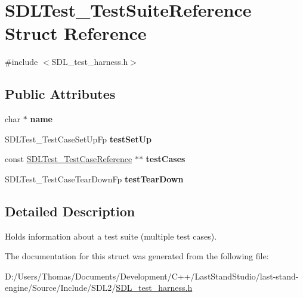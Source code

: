 \hypertarget{structSDLTest__TestSuiteReference}{}\section{S\+D\+L\+Test\+\_\+\+Test\+Suite\+Reference Struct Reference}
\label{structSDLTest__TestSuiteReference}


{\ttfamily \#include $<$S\+D\+L\+\_\+test\+\_\+harness.\+h$>$}

\subsection*{Public Attributes}
\begin{DoxyCompactItemize}
\item 
\hypertarget{structSDLTest__TestSuiteReference_a8b002d932f91b321b384e59ae17f8f39}{}char $\ast$ {\bfseries name}\label{structSDLTest__TestSuiteReference_a8b002d932f91b321b384e59ae17f8f39}

\item 
\hypertarget{structSDLTest__TestSuiteReference_a8aa788b982efb93c93c2ab01202e0007}{}S\+D\+L\+Test\+\_\+\+Test\+Case\+Set\+Up\+Fp {\bfseries test\+Set\+Up}\label{structSDLTest__TestSuiteReference_a8aa788b982efb93c93c2ab01202e0007}

\item 
\hypertarget{structSDLTest__TestSuiteReference_a06d97ce5bcf9ceb1300cc4aa39c028d3}{}const \hyperlink{structSDLTest__TestCaseReference}{S\+D\+L\+Test\+\_\+\+Test\+Case\+Reference} $\ast$$\ast$ {\bfseries test\+Cases}\label{structSDLTest__TestSuiteReference_a06d97ce5bcf9ceb1300cc4aa39c028d3}

\item 
\hypertarget{structSDLTest__TestSuiteReference_ad66abaf20653fd7361d28c69f88ac702}{}S\+D\+L\+Test\+\_\+\+Test\+Case\+Tear\+Down\+Fp {\bfseries test\+Tear\+Down}\label{structSDLTest__TestSuiteReference_ad66abaf20653fd7361d28c69f88ac702}

\end{DoxyCompactItemize}


\subsection{Detailed Description}
Holds information about a test suite (multiple test cases). 

The documentation for this struct was generated from the following file\+:\begin{DoxyCompactItemize}
\item 
D\+:/\+Users/\+Thomas/\+Documents/\+Development/\+C++/\+Last\+Stand\+Studio/last-\/stand-\/engine/\+Source/\+Include/\+S\+D\+L2/\hyperlink{SDL__test__harness_8h}{S\+D\+L\+\_\+test\+\_\+harness.\+h}\end{DoxyCompactItemize}
